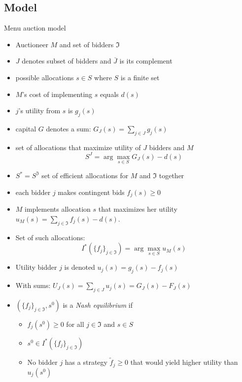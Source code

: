 \documentclass[11pt,english]{beamer}
\begin{document}
\subsection{Model}

\begin{frame}[allowframebreaks]{Menu auction model}
  \begin{itemize}
  \item Auctioneer $M$ and set of bidders $\Im$
  \item $J$ denotes subset of bidders and $\bar{J}$ is its complement
  \item possible allocations $s \in S$ where $S$ is a finite set
  \item $M$'s cost of implementing $s$ equals $d(s)$
  \item $j$'s utility from $s$ is $g_j(s)$
  \item capital $G$ denotes a sum: $G_J(s) = \sum_{j \in J} g_j(s)$
  \item set of allocations that maximize utility of $J$ bidders and $M$
    \begin{equation}
      \label{eq:SJ}
      S^J = \arg\max_{s \in S} G_J(s)-d(s)
    \end{equation}
  \item $S^*=S^{\Im}$ set of efficient allocations for $M$ and $\Im$ together
  \item each bidder $j$ makes contingent bids $f_j(s) \geq 0$
  \item $M$ implements allocation $s$ that maximizes her utility $u_M(s) =
    \sum_{j \in \Im} f_j(s) - d(s)$.
  \item Set of such allocations:
    \begin{equation}
      \label{eq:Istar}
      I^*(\{f_j\}_{j \in \Im}) = \arg\max_{s \in S} u_M(s)
    \end{equation}
  \item Utility bidder $j$ is denoted $u_j(s) = g_j(s) - f_j(s)$
  \item With sums: $U_J(s) =\sum_{j \in J} u_j(s) = G_J(s) - F_J(s)$
  \item $(\{f_j\}_{j \in \Im},s^0)$ is a \emph{Nash equilibrium} if
    \begin{itemize}
    \item $f_j(s^0) \geq 0$ for all $j \in \Im$ and $s \in S$
    \item $s^0 \in  I^*(\{f_j\}_{j \in \Im})$
    \item No bidder $j$ has a strategy $\tilde{f}_j \geq 0$ that would yield
      higher utility than $u_j(s^0)$
    \end{itemize}
  \end{itemize}
\end{frame}
\end{document}
